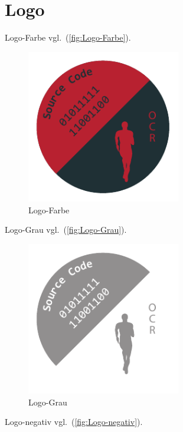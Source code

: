 \section{Logo}\label{logo}

Logo-Farbe vgl.~(\autoref{fig:Logo-Farbe}).

\begin{figure}[!hb]%
\centering
\includegraphics[width=0.6\textwidth]{Grafiken/Logo-Farbe.pdf}
\caption{Logo-Farbe}
\label{fig:Logo-Farbe}%
\end{figure}

Logo-Grau vgl.~(\autoref{fig:Logo-Grau}).

\begin{figure}[!hb]%
\centering
\includegraphics[width=0.6\textwidth]{Grafiken/Logo-Grau.pdf}
\caption{Logo-Grau}
\label{fig:Logo-Grau}%
\end{figure}

Logo-negativ vgl.~(\autoref{fig:Logo-negativ}).

